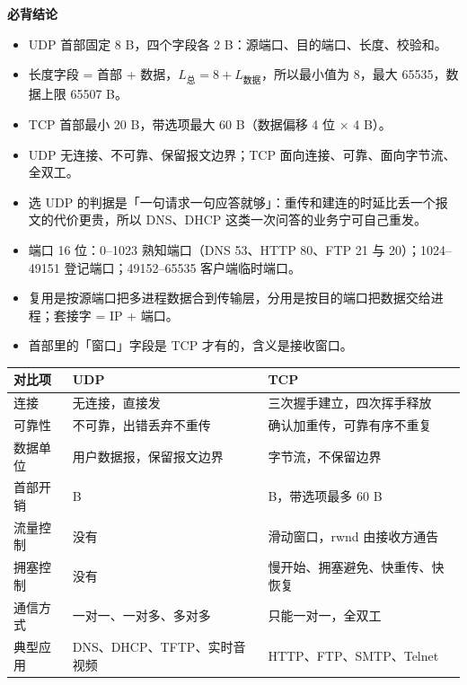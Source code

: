 \documentclass[10pt,a4paper]{ctexart}
\begin{document}



\textbf{必背结论}

\begin{itemize}

\item UDP 首部固定 8 B，四个字段各 2 B：源端口、目的端口、长度、校验和。

\item 长度字段 = 首部 + 数据，$L_{总}=8+L_{数据}$，所以最小值为 8，最大 65535，数据上限 65507 B。

\item TCP 首部最小 20 B，带选项最大 60 B（数据偏移 4 位 × 4 B）。

\item UDP 无连接、不可靠、保留报文边界；TCP 面向连接、可靠、面向字节流、全双工。

\item 选 UDP 的判据是「一句请求一句应答就够」：重传和建连的时延比丢一个报文的代价更贵，所以 DNS、DHCP 这类一次问答的业务宁可自己重发。

\item 端口 16 位：0–1023 熟知端口（DNS 53、HTTP 80、FTP 21 与 20）；1024–49151 登记端口；49152–65535 客户端临时端口。

\item 复用是按源端口把多进程数据合到传输层，分用是按目的端口把数据交给进程；套接字 = IP + 端口。

\item 首部里的「窗口」字段是 TCP 才有的，含义是接收窗口。

\end{itemize}

\begin{center}\small
\begin{tabularx}{\linewidth}{@{}l>{\raggedright\arraybackslash}X>{\raggedright\arraybackslash}X@{}}
\toprule
对比项 & UDP & TCP \\
\midrule
连接 & 无连接，直接发 & 三次握手建立，四次挥手释放 \\
可靠性 & 不可靠，出错丢弃不重传 & 确认加重传，可靠有序不重复 \\
数据单位 & 用户数据报，保留报文边界 & 字节流，不保留边界 \\
首部开销 & 8 B & 20 B，带选项最多 60 B \\
流量控制 & 没有 & 滑动窗口，rwnd 由接收方通告 \\
拥塞控制 & 没有 & 慢开始、拥塞避免、快重传、快恢复 \\
通信方式 & 一对一、一对多、多对多 & 只能一对一，全双工 \\
典型应用 & DNS、DHCP、TFTP、实时音视频 & HTTP、FTP、SMTP、Telnet \\
\bottomrule
\end{tabularx}
\end{center}
\end{document}
